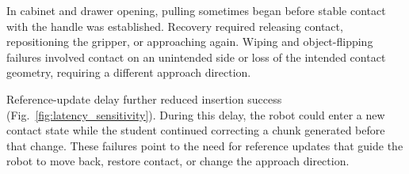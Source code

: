 In cabinet and drawer opening, pulling sometimes began before stable contact with the handle was established. Recovery required releasing contact, repositioning the gripper, or approaching again. Wiping and object-flipping failures involved contact on an unintended side or loss of the intended contact geometry, requiring a different approach direction.

Reference-update delay further reduced insertion success (Fig.~\ref{fig:latency_sensitivity}). During this delay, the robot could enter a new contact state while the student continued correcting a chunk generated before that change. These failures point to the need for reference updates that guide the robot to move back, restore contact, or change the approach direction.
